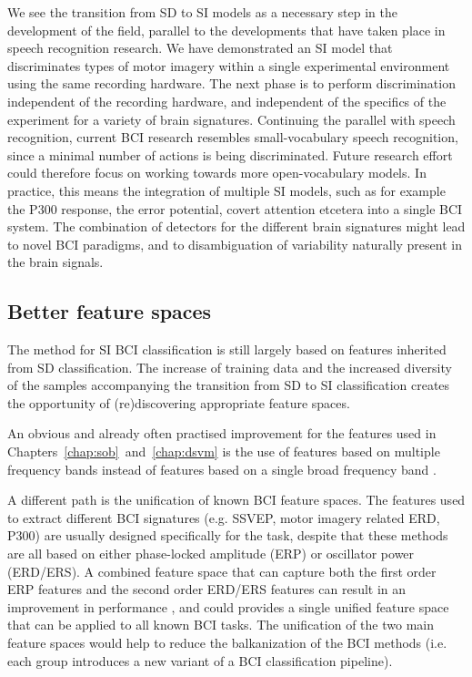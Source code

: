 \begin{sloppypar}
We see the transition from \acl{SD} to \acl{SI} models as a necessary step in
the development of the field, parallel to the developments that have taken
place in speech recognition research. We have demonstrated an \ac{SI} model
that discriminates types of motor imagery within a single experimental
environment using the same recording hardware. The next phase is to perform
discrimination independent of the recording hardware, and independent of the
specifics of the experiment for a variety of brain signatures.
%
Continuing the parallel with speech recognition, current \ac{BCI} research
resembles small-vocabulary speech recognition, since a minimal number of
actions is being discriminated. Future research effort could therefore focus
on working towards more open-vocabulary models. In practice, this means the
integration of multiple \ac{SI} models, such as for example the P300 response,
the error potential, covert attention etcetera into a single \ac{BCI} system. 
%
The combination of detectors for the different brain signatures might lead to
novel \ac{BCI} paradigms, and to disambiguation of variability naturally
present in the brain signals.
\end{sloppypar}

\subsection{Better feature spaces}
The method for \ac{SI} \ac{BCI} classification is still largely based on
features inherited from \ac{SD} classification. The increase of training data
and the increased diversity of the samples accompanying the transition from
\ac{SD} to \ac{SI} classification creates the opportunity of (re)discovering
appropriate feature spaces.

An obvious and already often practised improvement for the features used in
Chapters~\ref{chap:sob}~and~\ref{chap:dsvm} is the use of features based on
multiple frequency bands instead of features based on a single broad frequency
band \cite{lotte2009cdt, farquhar2009lfs}.

A different path is the unification of known \ac{BCI} feature spaces. The
features used to extract different \ac{BCI} signatures (e.g. \ac{SSVEP}, motor
imagery related \ac{ERD}, P300) are usually designed specifically for the task,
despite that these methods are all based on either phase-locked amplitude
(\ac{ERP}) or oscillator power (\ac{ERD}/\ac{ERS}).
%
A combined feature space that can capture both the first order \ac{ERP}
features and the second order \ac{ERD}/\ac{ERS} features can result in an
improvement in performance \cite{christoforou2010sob}, and could provides a
single unified feature space that can be applied to all known \ac{BCI} tasks.
The unification of the two main feature spaces would help to reduce the
balkanization of the \ac{BCI} methods (i.e. each group introduces a new variant
of a \ac{BCI} classification pipeline).

